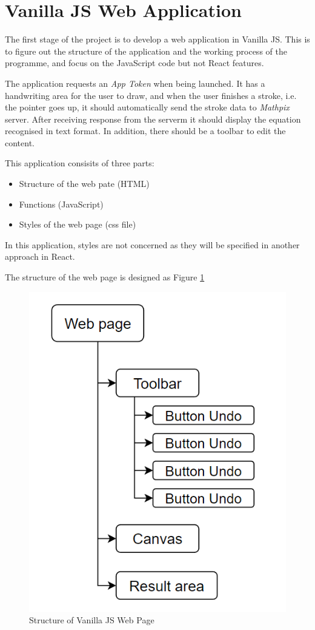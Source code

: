 \documentclass[12pt,twoside]{report}
\begin{document}
\section{Vanilla JS Web Application}
\label{vanillajs-implement}
The first stage of the project is to develop a web application in Vanilla JS. This is to figure out the structure of the application and the working process of the programme, and focus on the JavaScript code but not React features.

The application
requests an \textit{App Token} when being launched. It has a handwriting area
for the user to draw, and when the user finishes a stroke, i.e. the pointer goes
up, it should automatically send the stroke data to \textit{Mathpix} server.
After receiving response from the serverm it should display the equation
recognised in text format. In addition, there should be a toolbar to edit the
content. 

This application consisits of three parts: 
\begin{itemize}
    \item Structure of the web pate (HTML)
    \item Functions (JavaScript)
    \item Styles of the web page (css file)
\end{itemize}

In this application, styles are not concerned as they will be specified in another approach in React. 

The structure of the web page is designed as Figure \ref{fig:vanillajs-structure}

\begin{figure}
    \centering
    \includegraphics[width=0.5\linewidth, frame]{figures/vanillajs-structure.png}
    \caption{Structure of Vanilla JS Web Page}
    \label{fig:vanillajs-structure}
\end{figure}
\end{document}
